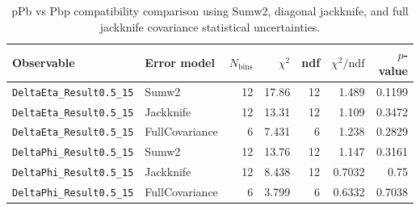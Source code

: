 \begin{table}[htbp]
\centering
\begin{tabular}{|l|l|r|r|r|r|r|}
\hline
Observable & Error model & $N_{\mathrm{bins}}$ & $\chi^2$ & ndf & $\chi^2/\mathrm{ndf}$ & $p$-value \\
\hline
\texttt{DeltaEta_Result0.5_15} & Sumw2 & 12 & 17.86 & 12 & 1.489 & 0.1199 \\
\texttt{DeltaEta_Result0.5_15} & Jackknife & 12 & 13.31 & 12 & 1.109 & 0.3472 \\
\texttt{DeltaEta_Result0.5_15} & FullCovariance & 6 & 7.431 & 6 & 1.238 & 0.2829 \\
\texttt{DeltaPhi_Result0.5_15} & Sumw2 & 12 & 13.76 & 12 & 1.147 & 0.3161 \\
\texttt{DeltaPhi_Result0.5_15} & Jackknife & 12 & 8.438 & 12 & 0.7032 & 0.75 \\
\texttt{DeltaPhi_Result0.5_15} & FullCovariance & 6 & 3.799 & 6 & 0.6332 & 0.7038 \\
\hline
\end{tabular}
\caption{pPb vs Pbp compatibility comparison using Sumw2, diagonal jackknife, and full jackknife covariance statistical uncertainties.}
\label{tab:ppbp-compatibility}
\end{table}
